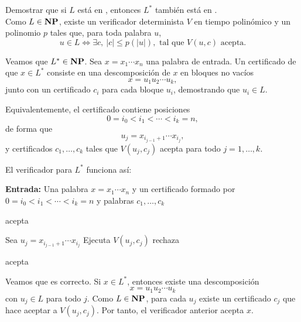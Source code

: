 
\begin{ejercicio}
    Demostrar que si $L$ está en \NP, entonces $L^*$ también está en \NP. \\

    Como $L \in \textbf{NP}$, existe un verificador determinista $V$ en tiempo polinómico y
    un polinomio $p$ tales que, para toda palabra $u$,
    $$u \in L \iff \exists c,\ |c| \leq p(|u|), \text{ tal que } V(u,c) \text{ acepta}.$$

    Veamos que $L^* \in \textbf{NP}$. Sea $x = x_1 \cdots x_n$ una palabra de entrada.
    Un certificado de que $x \in L^*$ consiste en una descomposición de $x$ en bloques
    no vacíos
    $$x = u_1u_2\cdots u_k,$$
    junto con un certificado $c_i$ para cada bloque $u_i$, demostrando que
    $u_i \in L$.

    Equivalentemente, el certificado contiene posiciones
    $$0 = i_0 < i_1 < \cdots < i_k = n,$$
    de forma que
    $$u_j = x_{i_{j-1}+1}\cdots x_{i_j},$$
    y certificados $c_1,\dots,c_k$ tales que $V(u_j,c_j)$ acepta para todo
    $j = 1,\dots,k$.

    El verificador para $L^*$ funciona así:

    \begin{algorithm}
        \caption{Verificador para $L^*$}
        \begin{algorithmic}
            \State \textbf{Entrada:} Una palabra $x = x_1 \cdots x_n$ y un certificado
            formado por $0 = i_0 < i_1 < \cdots < i_k = n$ y palabras $c_1,\dots,c_k$

                \State acepta
            \EndIf

                \State Sea $u_j = x_{i_{j-1}+1}\cdots x_{i_j}$
                \State Ejecuta $V(u_j,c_j)$
                    \State rechaza
                \EndIf
            \EndFor

            \State acepta
        \end{algorithmic}
    \end{algorithm}

    Veamos que es correcto. Si $x \in L^*$, entonces existe una descomposición
    $$x = u_1u_2\cdots u_k$$
    con $u_j \in L$ para todo $j$. Como $L \in \textbf{NP}$, para cada $u_j$ existe un
    certificado $c_j$ que hace aceptar a $V(u_j,c_j)$. Por tanto, el verificador
    anterior acepta $x$.


\end{ejercicio}
